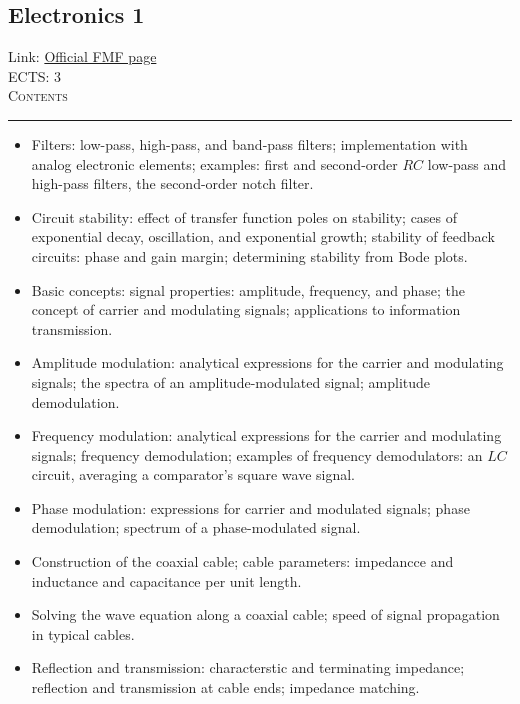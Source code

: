 \documentclass[11pt, a4paper]{article}
\newenvironment{course}[3]{
\subsection{#1}%
Link: \href{#2}{Official FMF page}\\%
ECTS: #3%
\vspace{1ex}
\\
{\large \textsc{Contents}}\\[-0.9ex]%
\rule{\textwidth}{0.5pt}
\vspace{-3ex}
}
{}
\newenvironment{chapter}[1]{
\begin{tcolorbox}[title=#1, breakable]
}
{\end{tcolorbox}}
\begin{document}
\begin{course}{Electronics 1}{https://www.fmf.uni-lj.si/en/study-physics/programmes/1fiz/2020/7000777/courses/1134/}{3}
\begin{chapter}{Circuit analysis}
\begin{itemize}
            \item Filters: low-pass, high-pass, and band-pass filters; implementation with analog electronic elements; examples: first and second-order $ RC $ low-pass and high-pass filters, the second-order notch filter.

            \item Circuit stability: effect of transfer function poles on stability; cases of exponential decay, oscillation, and exponential growth; stability of feedback circuits: phase and gain margin; determining stability from Bode plots.
        \end{itemize}
    \end{chapter}

    \begin{chapter}{Modulation}
        \begin{itemize}
        
            \item Basic concepts: signal properties: amplitude, frequency, and phase; the concept of carrier and modulating signals; applications to information transmission.

            \item Amplitude modulation: analytical expressions for the carrier and modulating signals; the spectra of an amplitude-modulated signal; amplitude demodulation.

            \item Frequency modulation: analytical expressions for the carrier and modulating signals; frequency demodulation; examples of frequency demodulators: an $ LC $ circuit, averaging a comparator's square wave signal.

            \item Phase modulation: expressions for carrier and modulated signals; phase demodulation; spectrum of a phase-modulated signal.
        
        \end{itemize}
    \end{chapter}

    \begin{chapter}{Signal propagation along coaxial cables}
        \begin{itemize}
        
            \item Construction of the coaxial cable; cable parameters: impedancce and inductance and capacitance per unit length.

            \item Solving the wave equation along a coaxial cable; speed of signal propagation in typical cables.

            \item Reflection and transmission: characterstic and terminating impedance; reflection and transmission at cable ends; impedance matching.
        
        \end{itemize}
    \end{chapter}
\end{course}
\end{document}
